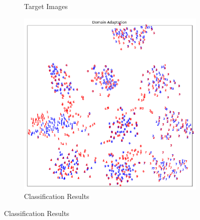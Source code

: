 \documentclass{beamer}
\begin{document}
\begin{frame}
\begin{figure}
\begin{subfigure}[b]{0.3\linewidth}
            \caption{Target Images}
        \end{subfigure}
        \hfill
        \begin{subfigure}[b]{0.3\linewidth}
            \includegraphics[width=\linewidth]{DNS_MNIST_MNISTM.png}
            \caption{Classification Results}
        \end{subfigure}
    \end{figure}
\end{frame}
\end{document}
